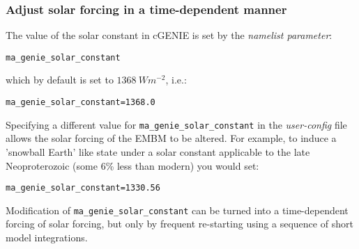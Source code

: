 \documentclass[11pt,fleqn]{book} %
\begin{document}
%
\subsubsection{Adjust solar forcing in a time-dependent manner}

\vspace{1mm}
The value of the solar constant in cGENIE is set by the \textit{namelist parameter}:
\vspace{-2pt}\begin{verbatim}
ma_genie_solar_constant
\end{verbatim}\vspace{-2pt}
which by default is set to \(1368\:W m^{-2}\), i.e.:
\vspace{-2pt}\begin{verbatim}
ma_genie_solar_constant=1368.0
\end{verbatim}\vspace{-2pt}

Specifying a different value for \texttt{ma\_genie\_solar\_constant} in the \textit{user-config} file allows the solar forcing of the EMBM to be altered. For example, to induce a 'snowball Earth' like state under a solar constant applicable to the late Neoproterozoic (some 6\% less than modern) you would set:
\vspace{-2pt}\begin{verbatim}
ma_genie_solar_constant=1330.56
\end{verbatim}\vspace{-2pt}

Modification of \texttt{ma\_genie\_solar\_constant} can be turned into a time-dependent forcing of solar forcing, but only by frequent re-starting using a sequence of short model integrations.
\end{document}
